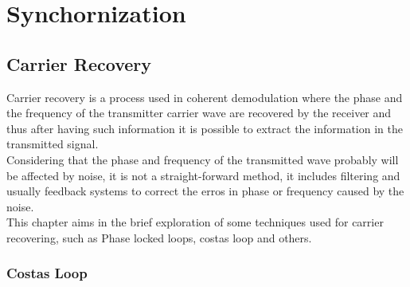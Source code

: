 \chapter{Synchornization}

\section{Carrier Recovery}

Carrier recovery is a process used in coherent demodulation where the phase
and the frequency of the transmitter carrier wave are recovered by the receiver
and thus after having such information it is possible to extract the information
in the transmitted signal.\\
Considering that the phase and frequency of the transmitted wave probably will
be affected by noise, it is not a straight-forward method, it includes filtering
and usually feedback systems to correct the erros in phase or frequency caused
by the noise.\\
This chapter aims in the brief exploration of some techniques used for carrier
recovering, such as Phase locked loops, costas loop and others.\\

\subsection{Costas Loop}
